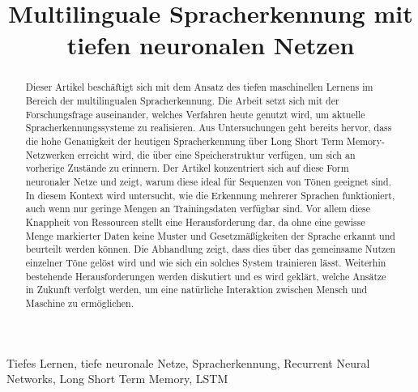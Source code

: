\documentclass[conference]{IEEEtran}
\begin{document}
	
	\title{Multilinguale Spracherkennung mit tiefen neuronalen
	Netzen\\
	}
	
	\author{
		\and
		\and
	
	}
	
	\maketitle
	
	\begin{abstract}
		Dieser Artikel beschäftigt sich mit dem Ansatz des tiefen maschinellen Lernens im Bereich der multilingualen Spracherkennung. Die Arbeit setzt sich mit der Forschungsfrage auseinander, welches Verfahren heute genutzt wird, um aktuelle Spracherkennungssysteme zu realisieren. Aus Untersuchungen geht bereits hervor, dass die hohe Genauigkeit der heutigen Spracherkennung über Long Short Term Memory-Netzwerken erreicht wird, die über eine Speicherstruktur verfügen, um sich an vorherige Zustände zu erinnern. Der Artikel konzentriert sich auf diese Form neuronaler Netze und zeigt, warum diese ideal für Sequenzen von Tönen geeignet sind. In diesem Kontext wird untersucht, wie die Erkennung mehrerer Sprachen funktioniert, auch wenn nur geringe Mengen an Trainingsdaten verfügbar sind. Vor allem diese Knappheit von Ressourcen stellt eine Herausforderung dar, da ohne eine gewisse Menge markierter Daten keine Muster und Gesetzmäßigkeiten der Sprache erkannt und beurteilt werden können. Die Abhandlung zeigt, dass dies über das gemeinsame Nutzen einzelner Töne gelöst wird und wie sich ein solches System trainieren lässt. Weiterhin bestehende Herausforderungen werden diskutiert und es wird geklärt, welche Ansätze in Zukunft verfolgt werden, um eine natürliche Interaktion zwischen Mensch und Maschine zu ermöglichen.
	\end{abstract}
	\begin{IEEEkeywords}
		Tiefes Lernen, tiefe neuronale Netze, Spracherkennung, Recurrent Neural Networks, Long Short Term Memory, LSTM 
	\end{IEEEkeywords}
	

	
	
	
	
	
	
	
	
	
	
	
\end{document}
